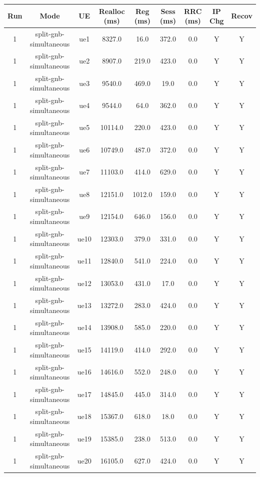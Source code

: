 \begin{table}[ht]
\centering
\begin{tabular}{|c|c|c|c|c|c|c|c|c|}
\hline
Run & Mode & UE & Realloc (ms) & Reg (ms) & Sess (ms) & RRC (ms) & IP Chg & Recov \\
\hline
1 & split-gnb-simultaneous & ue1 & 8327.0 & 16.0 & 372.0 & 0.0 & Y & Y \\
1 & split-gnb-simultaneous & ue2 & 8907.0 & 219.0 & 423.0 & 0.0 & Y & Y \\
1 & split-gnb-simultaneous & ue3 & 9540.0 & 469.0 & 19.0 & 0.0 & Y & Y \\
1 & split-gnb-simultaneous & ue4 & 9544.0 & 64.0 & 362.0 & 0.0 & Y & Y \\
1 & split-gnb-simultaneous & ue5 & 10114.0 & 220.0 & 423.0 & 0.0 & Y & Y \\
1 & split-gnb-simultaneous & ue6 & 10749.0 & 487.0 & 372.0 & 0.0 & Y & Y \\
1 & split-gnb-simultaneous & ue7 & 11103.0 & 414.0 & 629.0 & 0.0 & Y & Y \\
1 & split-gnb-simultaneous & ue8 & 12151.0 & 1012.0 & 159.0 & 0.0 & Y & Y \\
1 & split-gnb-simultaneous & ue9 & 12154.0 & 646.0 & 156.0 & 0.0 & Y & Y \\
1 & split-gnb-simultaneous & ue10 & 12303.0 & 379.0 & 331.0 & 0.0 & Y & Y \\
1 & split-gnb-simultaneous & ue11 & 12840.0 & 541.0 & 224.0 & 0.0 & Y & Y \\
1 & split-gnb-simultaneous & ue12 & 13053.0 & 431.0 & 17.0 & 0.0 & Y & Y \\
1 & split-gnb-simultaneous & ue13 & 13272.0 & 283.0 & 424.0 & 0.0 & Y & Y \\
1 & split-gnb-simultaneous & ue14 & 13908.0 & 585.0 & 220.0 & 0.0 & Y & Y \\
1 & split-gnb-simultaneous & ue15 & 14119.0 & 414.0 & 292.0 & 0.0 & Y & Y \\
1 & split-gnb-simultaneous & ue16 & 14616.0 & 552.0 & 248.0 & 0.0 & Y & Y \\
1 & split-gnb-simultaneous & ue17 & 14845.0 & 445.0 & 314.0 & 0.0 & Y & Y \\
1 & split-gnb-simultaneous & ue18 & 15367.0 & 618.0 & 18.0 & 0.0 & Y & Y \\
1 & split-gnb-simultaneous & ue19 & 15385.0 & 238.0 & 513.0 & 0.0 & Y & Y \\
1 & split-gnb-simultaneous & ue20 & 16105.0 & 627.0 & 424.0 & 0.0 & Y & Y \\

\end{tabular}
\end{table}
